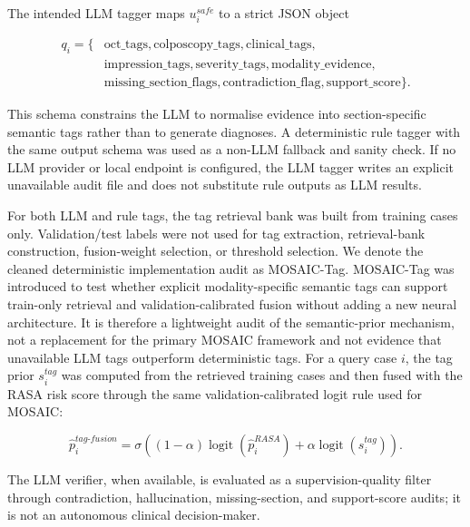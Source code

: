 \documentclass[11pt, a4paper]{article}
\theoremstyle{plain}
\theoremstyle{definition}
\begin{document}
The intended LLM tagger maps \(u_i^{safe}\) to a strict JSON object

\begin{equation}
\begin{aligned}
q_i = \{&
\mathrm{oct\_tags},\mathrm{colposcopy\_tags},\mathrm{clinical\_tags},\\
&\mathrm{impression\_tags},\mathrm{severity\_tags},
\mathrm{modality\_evidence},\\
&\mathrm{missing\_section\_flags},
\mathrm{contradiction\_flag},
\mathrm{support\_score}
\}.
\end{aligned}
\end{equation}

This schema constrains the LLM to normalise evidence into section-specific semantic tags rather than to generate diagnoses. A deterministic rule tagger with the same output schema was used as a non-LLM fallback and sanity check. If no LLM provider or local endpoint is configured, the LLM tagger writes an explicit unavailable audit file and does not substitute rule outputs as LLM results.

For both LLM and rule tags, the tag retrieval bank was built from training cases only. Validation/test labels were not used for tag extraction, retrieval-bank construction, fusion-weight selection, or threshold selection. We denote the cleaned deterministic implementation audit as MOSAIC-Tag. MOSAIC-Tag was introduced to test whether explicit modality-specific semantic tags can support train-only retrieval and validation-calibrated fusion without adding a new neural architecture. It is therefore a lightweight audit of the semantic-prior mechanism, not a replacement for the primary MOSAIC framework and not evidence that unavailable LLM tags outperform deterministic tags. For a query case \(i\), the tag prior \(s_i^{tag}\) was computed from the retrieved training cases and then fused with the RASA risk score through the same validation-calibrated logit rule used for MOSAIC:

\begin{equation}
\hat p_i^{tag\text{-}fusion}
=
\sigma\left((1-\alpha)\operatorname{logit}(\hat p_i^{RASA})+
\alpha\operatorname{logit}(s_i^{tag})\right).
\end{equation}

The LLM verifier, when available, is evaluated as a supervision-quality filter through contradiction, hallucination, missing-section, and support-score audits; it is not an autonomous clinical decision-maker.
\end{document}
